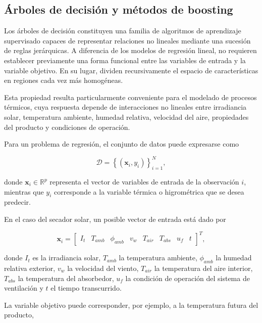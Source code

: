 \subsection{Árboles de decisión y métodos de boosting}
\label{subsec:arboles_boosting}

Los árboles de decisión constituyen una familia de algoritmos de aprendizaje supervisado capaces de representar relaciones no lineales mediante una sucesión de reglas jerárquicas. A diferencia de los modelos de regresión lineal, no requieren establecer previamente una forma funcional entre las variables de entrada y la variable objetivo. En su lugar, dividen recursivamente el espacio de características en regiones cada vez más homogéneas.

Esta propiedad resulta particularmente conveniente para el modelado de procesos térmicos, cuya respuesta depende de interacciones no lineales entre irradiancia solar, temperatura ambiente, humedad relativa, velocidad del aire, propiedades del producto y condiciones de operación.

Para un problema de regresión, el conjunto de datos puede expresarse como

\begin{equation}
\mathcal{D}
=
\left\{
\left(
\mathbf{x}_i,y_i
\right)
\right\}_{i=1}^{N},
\end{equation}

donde $\mathbf{x}_i\in\mathbb{R}^{p}$ representa el vector de variables de entrada de la observación $i$, mientras que $y_i$ corresponde a la variable térmica o higrométrica que se desea predecir.

En el caso del secador solar, un posible vector de entrada está dado por

\begin{equation}
\mathbf{x}_i
=
\begin{bmatrix}
I_t &
T_{amb} &
\phi_{amb} &
v_w &
T_{air} &
T_{abs} &
u_f &
t
\end{bmatrix}^{T},
\end{equation}

donde $I_t$ es la irradiancia solar, $T_{amb}$ la temperatura ambiente, $\phi_{amb}$ la humedad relativa exterior, $v_w$ la velocidad del viento, $T_{air}$ la temperatura del aire interior, $T_{abs}$ la temperatura del absorbedor, $u_f$ la condición de operación del sistema de ventilación y $t$ el tiempo transcurrido.

La variable objetivo puede corresponder, por ejemplo, a la temperatura futura del producto,

